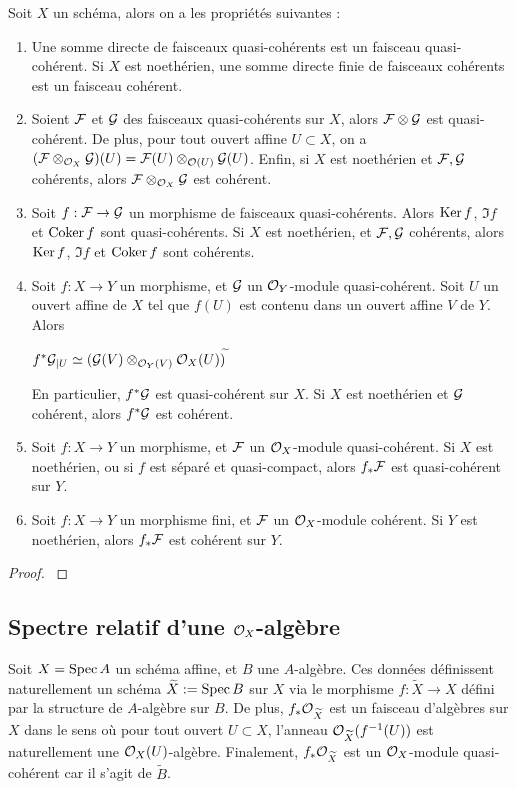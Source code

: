 \begin{prop}\label{FQCProps3}
Soit $X$ un schéma, alors on a les propriétés suivantes :
\begin{enumerate}
\item Une somme directe de faisceaux quasi-cohérents est un faisceau quasi-cohérent. Si $X$ est noethérien, une somme directe finie de faisceaux cohérents est un faisceau cohérent.
\item Soient $\mathcal{F}$ et $\mathcal{G}$ des faisceaux quasi-cohérents sur $X$, alors $\mathcal{F}\otimes \mathcal{G}$ est quasi-cohérent. De plus, pour tout ouvert affine $U\subset X$, on a $(\mathcal{F}\otimes_{\mathcal{O}_X}\mathcal{G})(U)=\mathcal{F}(U)\otimes_{\mathcal{O}(U)}\mathcal{G}(U)$. Enfin, si $X$ est noethérien et $\mathcal{F},\mathcal{G}$ cohérents, alors $\mathcal{F}\otimes_{\mathcal{O}_X} \mathcal{G}$ est cohérent.

\item Soit $f:\mathcal{F}\rightarrow \mathcal{G}$ un morphisme de faisceaux quasi-cohérents. Alors $\operatorname{Ker} f$, $\Im f$ et $\operatorname{Coker} f$ sont quasi-cohérents. Si $X$ est noethérien, et $\mathcal{F}, \mathcal{G}$ cohérents, alors $\operatorname{Ker} f$, $\Im f$ et $\operatorname{Coker} f$ sont cohérents.
\item Soit $f:X\rightarrow Y$ un morphisme, et $\mathcal{G}$ un $\mathcal{O}_Y$-module quasi-cohérent. Soit $U$ un ouvert affine de $X$ tel que $f(U)$ est contenu dans un ouvert affine $V$ de $Y$. Alors
\begin{center}
$f^*\mathcal{G}_{|U}\simeq(\mathcal{G}(V)\otimes_{\mathcal{O}_Y(V)}\mathcal{O}_X(U))^{\widetilde{}}$
\end{center}
En particulier, $f^*\mathcal{G}$ est quasi-cohérent sur $X$. Si $X$ est noethérien et $\mathcal{G}$ cohérent, alors $f^*\mathcal{G}$ est cohérent.
\item Soit $f:X\rightarrow Y$ un morphisme, et $\mathcal{F}$ un $\mathcal{O}_X$-module quasi-cohérent. Si $X$ est noethérien, ou si $f$ est séparé et quasi-compact, alors $f_*\mathcal{F}$ est quasi-cohérent sur $Y$.
\item Soit $f:X\rightarrow Y$ un morphisme fini, et $\mathcal{F}$ un $\mathcal{O}_X$-module cohérent. Si $Y$ est noethérien, alors $f_*\mathcal{F}$ est cohérent sur $Y$.
\end{enumerate}
\end{prop}
\begin{proof}
\cite[5.1.14]{QingLiu}
\end{proof}

\subsection{Spectre relatif d'une $\mathcal{O}_X$-algèbre}

Soit $X=\operatorname{Spec} A$ un schéma affine, et $B$ une $A$-algèbre. Ces données définissent naturellement un schéma $\widetilde{X}:=\operatorname{Spec} B$ sur $X$ via le morphisme $f:\widetilde{X}\rightarrow X$ défini par la structure de $A$-algèbre sur $B$. De plus, $f_*\mathcal{O}_{\widetilde{X}}$ est un faisceau d'algèbres sur $X$ dans le sens où pour tout ouvert $U\subset X$, l'anneau $\mathcal{O}_{\widetilde{X}}(f^{-1}(U))$ est naturellement une $\mathcal{O}_X(U)$-algèbre. Finalement, $f_*\mathcal{O}_{\widetilde{X}}$ est un $\mathcal{O}_X$-module quasi-cohérent car il s'agit de $\widetilde{B}$.

